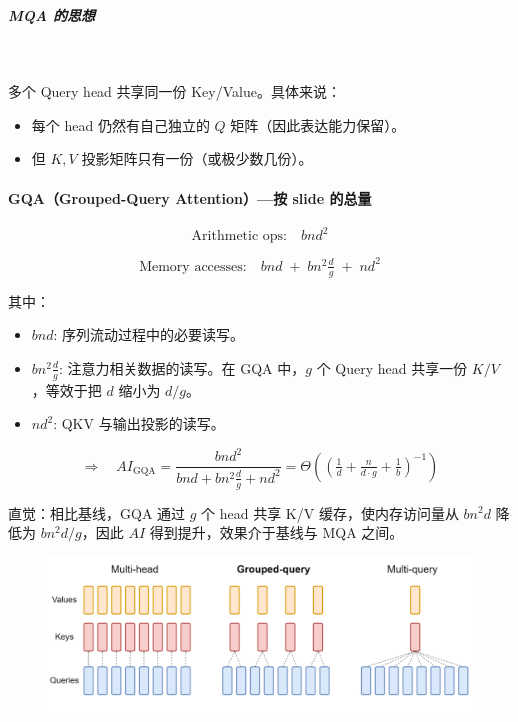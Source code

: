 \subparagraph{MQA 的思想}~{}

多个 Query head 共享同一份 Key/Value。具体来说：

\begin{itemize}
  \item 每个 head 仍然有自己独立的 $Q$ 矩阵（因此表达能力保留）。
  \item 但 $K, V$ 投影矩阵只有一份（或极少数几份）。
\end{itemize}





\paragraph{GQA（Grouped-Query Attention）—按 slide 的总量}

\[
\text{Arithmetic ops:} \quad b n d^{2}
\]

\[
\text{Memory accesses:} \quad b n d \;+\; b n^{2} \tfrac{d}{g} \;+\; n d^{2}
\]

其中：
\begin{itemize}
  \item $b n d$: 序列流动过程中的必要读写。
  \item  $b n^{2} \tfrac{d}{g}$: 注意力相关数据的读写。在 GQA 中，$g$ 个 Query head 共享一份 $K/V$，等效于把 $d$ 缩小为 $d/g$。
  \item  $n d^{2}$: QKV 与输出投影的读写。
\end{itemize}
\[
\Rightarrow \quad 
AI_{\text{GQA}}
= \frac{b n d^{2}}{b n d + b n^{2} \tfrac{d}{g} + n d^{2}}
= \Theta \!\left( \left( \tfrac{1}{d} + \tfrac{n}{d \cdot g} + \tfrac{1}{b} \right)^{-1} \right)
\]


直觉：相比基线，GQA 通过 $g$ 个 head 共享 K/V 缓存，使内存访问量从 $b n^{2} d$ 降低为 $b n^{2} d/g$，因此 $AI$ 得到提升，效果介于基线与 MQA 之间。

\begin{figure}[htbp]
  \centering
  \includegraphics[width=1\linewidth]{figs/lec3/lec3.35.png}
\end{figure}


